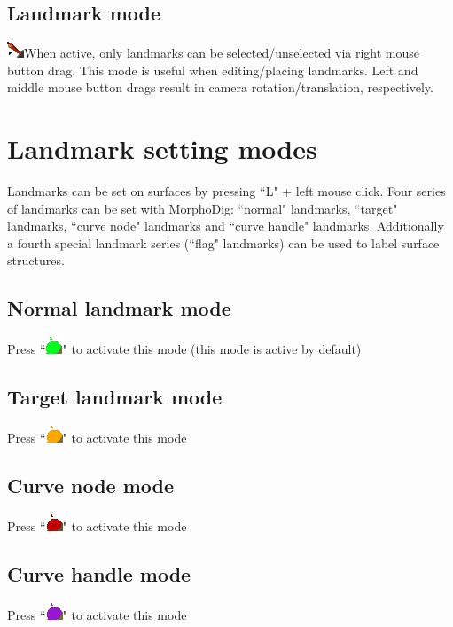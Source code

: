 \subsection{Landmark mode}
  \includegraphics[scale=0.7]{images/04/Landmarks2.png}When active, only landmarks can be selected/unselected via right mouse button drag. This mode is useful when editing/placing landmarks. Left and middle mouse button drags result in camera rotation/translation, respectively.

\section{Landmark setting modes}
Landmarks can be set on surfaces by pressing ``L" + left mouse click. 
Four series of landmarks can be set with MorphoDig: ``normal" landmarks, ``target" landmarks, ``curve node" landmarks and ``curve handle" landmarks. Additionally a fourth special landmark series (``flag" landmarks) can be used to label surface structures. 

\subsection{Normal landmark mode}	
Press ``\includegraphics[scale=0.7]{images/04/normal_landmarks.png}" to activate this mode (this mode is active by default)

\subsection{Target landmark mode}	
Press ``\includegraphics[scale=0.7]{images/04/target_landmarks.png}"  to activate this mode

\subsection{Curve node mode}	
Press ``\includegraphics[scale=0.7]{images/04/curve_nodes.png}" to activate this mode 

\subsection{Curve handle mode}	
Press ``\includegraphics[scale=0.7]{images/04/curve_handles.png}"  to activate this mode


